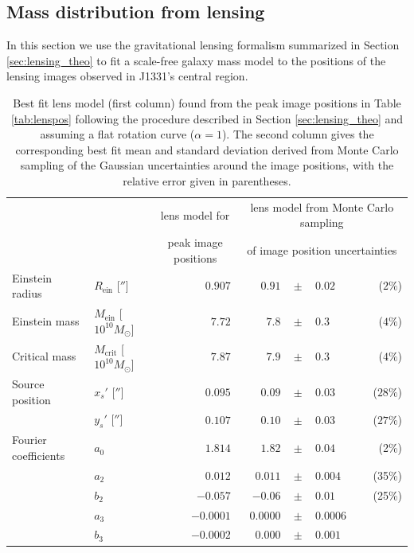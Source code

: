 \documentclass[useAMS,usenatbib]{mnras}
\begin{document}
\subsection{Mass distribution from lensing} \label{sec:results_lensing}

In this section we use the gravitational lensing formalism summarized in Section \ref{sec:lensing_theo} to fit a scale-free galaxy mass model to the positions of the lensing images observed in J1331's central region.

\begin{table}
\centering
\caption{Best fit lens model (first column) found from the peak image positions in Table \ref{tab:lenspos} following the procedure described in Section \ref{sec:lensing_theo} and assuming a flat rotation curve ($\alpha = 1$). The second column gives the corresponding best fit mean and standard deviation derived from Monte Carlo sampling of the Gaussian uncertainties around the image positions, with the relative error given in parentheses.}
\begin{tabular}{llrrclr}
\hline
 &  & \multicolumn{1}{c}{lens model for} &\multicolumn{4}{c}{lens model from Monte Carlo sampling  } \\
 &  & \multicolumn{1}{c}{peak image positions}  & \multicolumn{4}{c}{of image position uncertainties}  \\ \hline
Einstein radius      & $R_\text{ein}$ [$''$]             & $0.907$ & $0.91$  & $\pm$ & $     0.02$ & ($2\%$)\\
Einstein mass        & $M_\text{ein}$ [$10^{10} M_\odot$]  & $7.72$  & $7.8 $  & $\pm$ & $      0.3$ & ($4\%$) \\
Critical mass        & $M_\text{crit}$ [$10^{10} M_\odot$] & $7.87$  & $7.9$   & $\pm$ & $      0.3$ & ($4\%$)\\
Source position      & $x_s'$ [$''$]                      & $0.095$ & $0.09 $ & $\pm$ & $     0.03$ & ($28\%$)\\
                     & $y_s'$ [$''$]                     & $0.107$ & $0.10 $ & $\pm$ & $     0.03$ & ($27\%$)\\
Fourier coefficients & $a_0$                               & $1.814$ & $1.82 $ & $\pm$ & $   0.04$ & (2\%)\\
                     & $a_2$                               & $0.012$ & $ 0.011 $ & $\pm$ & $    0.004$ & (35\%)\\
                     & $b_2$                               & $-0.057$ & $-0.06 $  & $\pm$ & $  0.01$ & (25\%)\\
                     & $a_3$                               & $-0.0001$& $0.0000 $ & $\pm$ & $   0.0006$ & \\
                     & $b_3$                               & $-0.0002$&$0.000 $   & $\pm$ & $  0.001$ & \\\hline
\end{tabular}  
\label{tab:bestfitlensmodel} 
\end{table}
\end{document}

